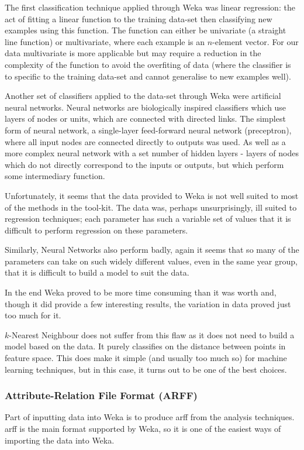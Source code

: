 The first classification technique applied through Weka was linear 
regression\cite[p.717-727]{Russell2010Artificial}: the act of fitting a linear function to the 
training data-set then classifying new examples using this function. The function can either be
univariate (a straight line function) or multivariate, where each example is an $n$-element 
vector. For our data multivariate is more applicable but may require a reduction in the complexity
of the function to avoid the overfiting of data (where the classifier is to specific to the 
training data-set and cannot generalise to new examples well).

Another set of classifiers applied to the data-set through Weka were artificial neural 
networks\cite[p.727-737]{Russell2010Artificial}. Neural networks are biologically inspired 
classifiers which use layers of nodes or units, which are connected with directed links. The 
simplest form of neural network, a single-layer feed-forward neural network (preceptron), where
all input nodes are connected directly to outputs was used. As well as a more complex neural 
network with a set number of hidden layers - layers of nodes which do not directly correspond to
the inputs or outputs, but which perform some intermediary function.

Unfortunately, it seems that the data provided to Weka is not well suited to most of the methods 
in the tool-kit. The data was, perhaps unsurprisingly, ill suited to regression techniques; each
parameter has such a variable set of values that it is difficult to perform regression on these
parameters.

Similarly, Neural Networks also perform badly, again it seems that so many of the parameters can
take on such widely different values, even in the same year group, that it is difficult to build
a model to suit the data.

In the end Weka proved to be more time consuming than it was worth and, though it did provide a 
few interesting results, the variation in data proved just too much for it.

$k$-Nearest Neighbour does not suffer from this flaw as it does not need to build a model based on
the data. It purely classifies on the distance between points in feature space. This does make it
simple (and usually too much so) for machine learning techniques, but in this case, it turns out to 
be one of the best choices.


\subsubsection{Attribute-Relation File Format (ARFF)}
Part of inputting data into Weka is to produce \gls{arff} from the
analysis techniques. \gls{arff} is the main format supported by Weka, so it is one of the easiest ways
of importing the data into Weka.

